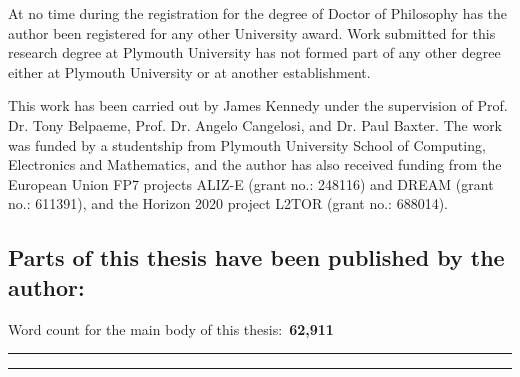 At no time during the registration for the degree of Doctor of Philosophy has the author been registered for any other University award. Work submitted for this research degree at Plymouth University has not formed part of any other degree either at Plymouth University or at another establishment.

This work has been carried out by James Kennedy under the supervision of Prof. Dr. Tony Belpaeme, Prof. Dr. Angelo Cangelosi, and Dr. Paul Baxter. The work was funded by a studentship from Plymouth University School of Computing, Electronics and Mathematics, and the author has also received funding from the European Union FP7 projects ALIZ-E (grant no.: 248116) and DREAM (grant no.: 611391), and the Horizon 2020 project L2TOR (grant no.: 688014).

\subsection*{Parts of this thesis have been published by the author:}














\vspace{1.0cm}

Word count for the main body of this thesis:~\textbf{62,911}

\vspace{1.0cm}

\rule{0.4\textwidth}{0.3pt}

\vspace{1cm} 

\rule{0.4\textwidth}{0.3pt}